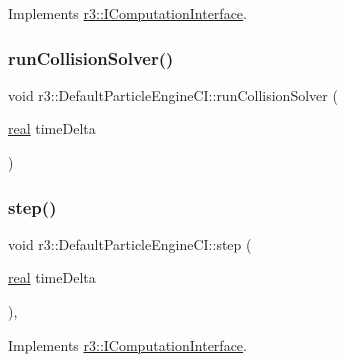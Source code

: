Implements \mbox{\hyperlink{classr3_1_1_i_computation_interface_a6069989c54ffd4e714788d0968851007}{r3\+::\+I\+Computation\+Interface}}.

\mbox{\label{classr3_1_1_default_particle_engine_c_i_a19138f7707e948b7e8e05647bcba52fe}} 
\subsubsection{\texorpdfstring{run\+Collision\+Solver()}{runCollisionSolver()}}
{\footnotesize\ttfamily void r3\+::\+Default\+Particle\+Engine\+C\+I\+::run\+Collision\+Solver (\begin{DoxyParamCaption}\item[{\mbox{\hyperlink{namespacer3_ab2016b3e3f743fb735afce242f0dc1eb}{real}}}]{time\+Delta }\end{DoxyParamCaption})\hspace{0.3cm}{\ttfamily [protected]}}

\mbox{\label{classr3_1_1_default_particle_engine_c_i_a7c58fd00ec521410e1b412e9885ee0d2}} 
\subsubsection{\texorpdfstring{step()}{step()}}
{\footnotesize\ttfamily void r3\+::\+Default\+Particle\+Engine\+C\+I\+::step (\begin{DoxyParamCaption}\item[{\mbox{\hyperlink{namespacer3_ab2016b3e3f743fb735afce242f0dc1eb}{real}}}]{time\+Delta }\end{DoxyParamCaption})\hspace{0.3cm}{\ttfamily [override]}, {\ttfamily [virtual]}}



Implements \mbox{\hyperlink{classr3_1_1_i_computation_interface_aaa12bcc35005f32a1984b38de97696cb}{r3\+::\+I\+Computation\+Interface}}.



